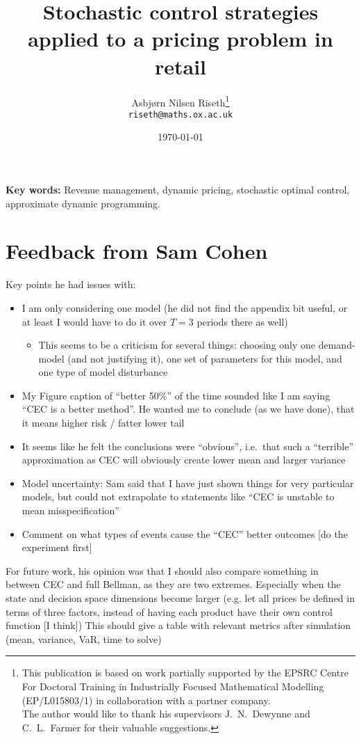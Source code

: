 \documentclass[a4paper,12pt]{article}
\title{Stochastic control strategies applied to a
  pricing problem in retail}
\author{Asbj{\o}rn Nilsen Riseth\thanks{
    This publication is based on work partially supported by the EPSRC
    Centre For Doctoral Training in Industrially Focused Mathematical
    Modelling (EP/L015803/1) in collaboration with a partner
    company.\\
    The author would like to thank his supervisors
    J.~N.~Dewynne and C.~L.~Farmer for their valuable suggestions.}\\
  {\footnotesize\texttt{riseth@maths.ox.ac.uk}}}
\affil{Mathematical Institute, University
  of Oxford, OX2 6GG.}
\date{\today}
\def\biblio{}
\begin{document}
\maketitle
\listoftodos

\def\biblio{}
\def\listoftodos{}



\vspace{1em}\noindent
\textbf{Key words:} Revenue management, dynamic pricing, stochastic
optimal control,
approximate dynamic programming.

\section{Feedback from Sam Cohen}
Key points he had issues with:
\begin{itemize}
\item I am only considering one model (he did not find the appendix
  bit useful, or at least I would have to do it over $T=3$ periods
  there as well)
  \begin{itemize}
  \item This seems to be a criticism for several things: choosing only one
    demand-model (and not justifying it), one set of parameters for
    this model, and one type of model disturbance
  \end{itemize}
\item My Figure caption of ``better 50\%'' of the time sounded like I
  am saying ``CEC is a better method''. He wanted me to conclude (as
  we have done), that it means higher risk / fatter lower tail
\item It seems like he felt the conclusions were ``obvious'',
  i.e.~that such a ``terrible'' approximation as CEC will obviously
  create lower mean and larger variance
\item Model uncertainty: Sam said that I have just shown things for
  very particular models, but could not extrapolate to statements like ``CEC
  is unstable to mean misspecification''
\item Comment on what types of events cause the ``CEC'' better
  outcomes [do the experiment first]
\end{itemize}

For future work, his opinion was that I should also compare something in between
CEC and full Bellman, as they are two extremes. Especially when the
state and decision space dimensions become larger (e.g. let all prices
be defined in terms of three factors, instead of having each product
have their own control function [I think])
This should give a table with relevant metrics after simulation (mean,
variance, VaR, time to solve)
\end{document}
